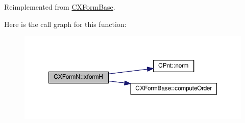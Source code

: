 Reimplemented from \hyperlink{classCXFormBase_a11c0c4624ddcc5ceb416b14c21d26549}{C\-X\-Form\-Base}.



Here is the call graph for this function\-:\nopagebreak
\begin{figure}[H]
\begin{center}
\leavevmode
\includegraphics[width=350pt]{classCXFormN_a8efc2d054609f23262d328c1a9940385_cgraph}
\end{center}
\end{figure}




